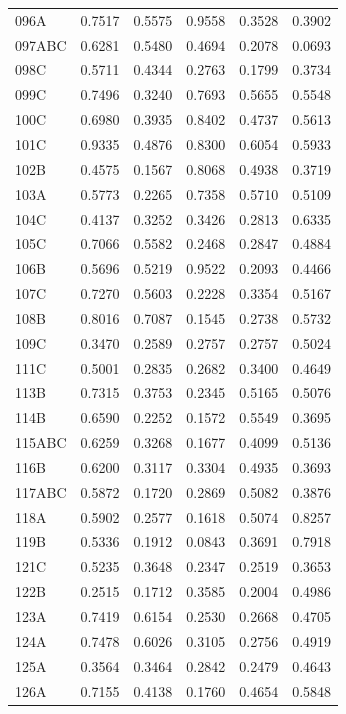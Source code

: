 \begin{longtable}{lrrrrr}
  096A & 0.7517 & 0.5575 & 0.9558 & 0.3528 & 0.3902 \\
  097ABC & 0.6281 & 0.5480 & 0.4694 & 0.2078 & 0.0693 \\
  098C & 0.5711 & 0.4344 & 0.2763 & 0.1799 & 0.3734 \\
  099C & 0.7496 & 0.3240 & 0.7693 & 0.5655 & 0.5548 \\
  100C & 0.6980 & 0.3935 & 0.8402 & 0.4737 & 0.5613 \\
  101C & 0.9335 & 0.4876 & 0.8300 & 0.6054 & 0.5933 \\
  102B & 0.4575 & 0.1567 & 0.8068 & 0.4938 & 0.3719 \\
  103A & 0.5773 & 0.2265 & 0.7358 & 0.5710 & 0.5109 \\
  104C & 0.4137 & 0.3252 & 0.3426 & 0.2813 & 0.6335 \\
  105C & 0.7066 & 0.5582 & 0.2468 & 0.2847 & 0.4884 \\
  106B & 0.5696 & 0.5219 & 0.9522 & 0.2093 & 0.4466 \\
  107C & 0.7270 & 0.5603 & 0.2228 & 0.3354 & 0.5167 \\
  108B & 0.8016 & 0.7087 & 0.1545 & 0.2738 & 0.5732 \\
  109C & 0.3470 & 0.2589 & 0.2757 & 0.2757 & 0.5024 \\
  111C  & 0.5001 & 0.2835 & 0.2682 & 0.3400 & 0.4649 \\
  113B & 0.7315 & 0.3753 & 0.2345 & 0.5165 & 0.5076 \\
  114B & 0.6590 & 0.2252 & 0.1572 & 0.5549 & 0.3695 \\
  115ABC & 0.6259 & 0.3268 & 0.1677 & 0.4099 & 0.5136 \\
  116B & 0.6200 & 0.3117 & 0.3304 & 0.4935 & 0.3693 \\
  117ABC & 0.5872 & 0.1720 & 0.2869 & 0.5082 & 0.3876 \\
  118A & 0.5902 & 0.2577 & 0.1618 & 0.5074 & 0.8257 \\
  119B & 0.5336 & 0.1912 & 0.0843 & 0.3691 & 0.7918 \\
  121C & 0.5235 & 0.3648 & 0.2347 & 0.2519 & 0.3653 \\
  122B & 0.2515 & 0.1712 & 0.3585 & 0.2004 & 0.4986 \\
  123A & 0.7419 & 0.6154 & 0.2530 & 0.2668 & 0.4705 \\
  124A & 0.7478 & 0.6026 & 0.3105 & 0.2756 & 0.4919 \\
  125A & 0.3564 & 0.3464 & 0.2842 & 0.2479 & 0.4643 \\
  126A & 0.7155 & 0.4138 & 0.1760 & 0.4654 & 0.5848 \\

\end{longtable}
